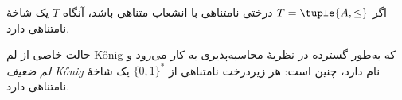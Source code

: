 \documentclass[../../../include/open-logic-section]{subfiles}
\begin{document}
\begin{prop}
اگر $T = \tuple{A,\le}$ درختی نامتناهی با انشعاب متناهی باشد،
آنگاه $T$ یک شاخهٔ نامتناهی دارد.
\end{prop}

حالت خاصی از لم \foreignlanguage{english}{K\H{o}nig} که به‌طور گسترده در نظریهٔ محاسبه‌پذیری به
کار می‌رود و \emph{لم ضعیف \foreignlanguage{english}{K\H{o}nig}} نام دارد، چنین است: هر زیردرخت
نامتناهی از $\{0,1\}^*$ یک شاخهٔ نامتناهی دارد.
\end{document}
